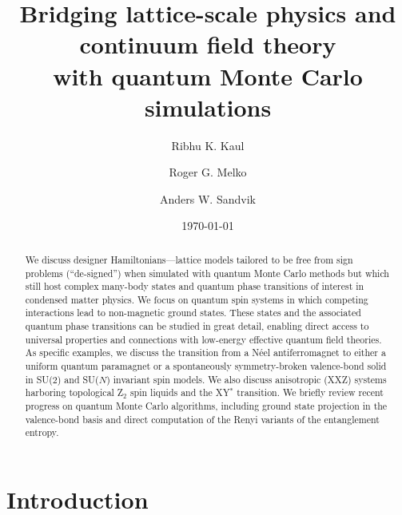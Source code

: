 \documentclass[10pt,pre,aps,twocolumn,showpacs,superscriptaddress,floatfix]{revtex4-1}
\begin{document}
\title{Bridging lattice-scale physics and continuum field theory \\ with quantum Monte Carlo simulations} 

\author{Ribhu K. Kaul}

\author{Roger G. Melko}

\author{Anders W. Sandvik}

\begin{abstract}
We discuss designer Hamiltonians---lattice models tailored to be free from sign problems (``de-signed'') when simulated with quantum 
Monte Carlo methods but which still host complex  many-body states and quantum phase transitions of interest in condensed matter 
physics. We focus on quantum spin systems in which competing interactions lead to non-magnetic ground states. These states and the 
associated quantum phase transitions can be studied in great detail, enabling direct access to universal properties and connections 
with low-energy effective quantum field theories. As specific examples, we discuss the transition from a N\'eel antiferromagnet to 
either a uniform quantum paramagnet or a spontaneously symmetry-broken valence-bond solid in SU($2$) and SU($N$) invariant spin models. 
We also discuss anisotropic (XXZ) systems harboring topological Z$_2$ spin liquids and the XY$^*$ transition. We briefly review recent 
progress on quantum Monte Carlo algorithms, including ground state projection in the valence-bond basis and direct computation 
of the Renyi variants of the entanglement entropy.
\end{abstract}

\maketitle

\tableofcontents

\date{\today}


\section{Introduction}
\label{sec:intro}
\end{document}
